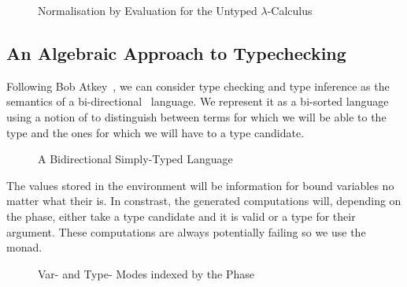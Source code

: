 \begin{figure}[h]
\caption{Normalisation by Evaluation for the Untyped $\lambda$-Calculus}
\end{figure}

\subsection{An Algebraic Approach to Typechecking}

Following Bob Atkey~\citeyear{atkey2015algebraic}, we can consider type checking
and type inference as the semantics of a bi-directional~\cite{pierce2000local}
language. We represent it as a bi-sorted language using a notion of  to
distinguish between terms for which we will be able to  the type and
the ones for which we will have to  a type candidate.

\begin{figure}[h]
\begin{minipage}{0.45\textwidth}
\end{minipage}
\begin{minipage}{0.45\textwidth}
\end{minipage}

\caption{A Bidirectional Simply-Typed Language}
\end{figure}

The values stored in the environment will be  information for bound
variables no matter what their  is. In constrast, the generated
computations will, depending on the phase, either take a type candidate and
 it is valid or  a type for their argument. These
computations are always potentially failing so we use the  monad.

\begin{figure}[h]
\begin{minipage}{0.40\textwidth}
\end{minipage}
\begin{minipage}{0.50\textwidth}
\end{minipage}
\caption{Var- and Type- Modes indexed by the Phase}
\end{figure}

